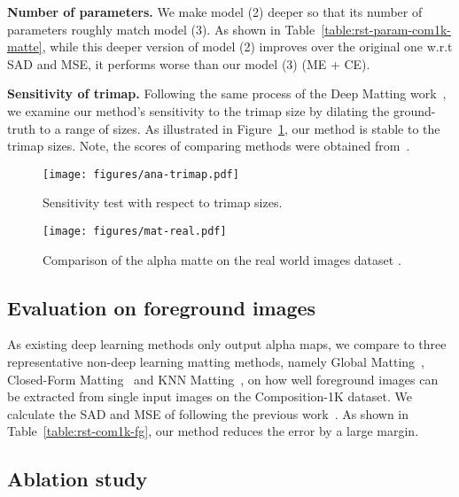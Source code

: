 \documentclass[10pt,twocolumn,letterpaper]{article}
\begin{document}
\noindent\textbf{Number of parameters.} We make model (2) deeper so that its number of parameters roughly match model (3). As shown in Table~\ref{table:rst-param-com1k-matte}, while this deeper version of model (2) improves over the original one w.r.t SAD and MSE, it  performs worse than our model (3) (ME + CE).


\noindent\textbf{Sensitivity of trimap.} Following the same process of the Deep Matting work~\cite{xu2017deep}, we examine our method's sensitivity to the trimap size by dilating the ground-truth to a range of sizes. As illustrated in Figure~\ref{fig:ana-trimap}, our method is stable to the trimap sizes. Note, the scores of comparing methods were obtained from~\cite{xu2017deep}.


\begin{figure}[t]
	\centering
	\texttt{[image: figures/ana-trimap.pdf]}\vspace{-0.05in}
	\caption{Sensitivity test with respect to trimap sizes.}\vspace{-0.2in}
	\label{fig:ana-trimap} 
\end{figure} 

\begin{figure*}[t]
	\centering
	\texttt{[image: figures/mat-real.pdf]}\vspace{-0.06in}
	\caption{Comparison of the alpha matte on the real world images dataset \cite{xu2017deep}.}\vspace{-0.225in}
	\label{fig:real-mat}
\end{figure*}


\subsection{Evaluation on foreground images}

As existing deep learning methods only output alpha maps,  we compare to three representative non-deep learning matting methods, namely Global Matting~\cite{he2011global}, Closed-Form Matting~\cite{levin2008closed} and KNN Matting~\cite{chen2013knn}, on how well foreground images can be extracted from single input images on the Composition-1K dataset.  We calculate the SAD and MSE of  following the previous work~\cite{price2010simultaneous}. As shown in Table~\ref{table:rst-com1k-fg}, our method reduces the error by a large margin. 



\subsection{Ablation study}
\end{document}
